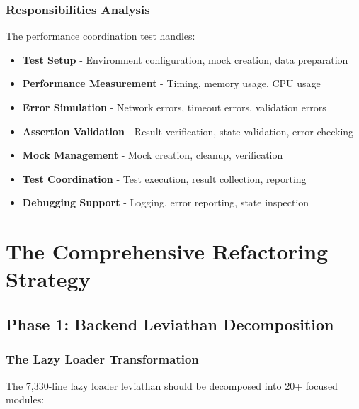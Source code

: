 \documentclass[11pt]{article}
\begin{document}
\subsubsection{Responsibilities Analysis}

The performance coordination test handles:

\begin{itemize}
\item \textbf{Test Setup} - Environment configuration, mock creation, data preparation
\item \textbf{Performance Measurement} - Timing, memory usage, CPU usage
\item \textbf{Error Simulation} - Network errors, timeout errors, validation errors
\item \textbf{Assertion Validation} - Result verification, state validation, error checking
\item \textbf{Mock Management} - Mock creation, cleanup, verification
\item \textbf{Test Coordination} - Test execution, result collection, reporting
\item \textbf{Debugging Support} - Logging, error reporting, state inspection
\end{itemize}

\section{The Comprehensive Refactoring Strategy}

\subsection{Phase 1: Backend Leviathan Decomposition}

\subsubsection{The Lazy Loader Transformation}

The 7,330-line lazy loader leviathan should be decomposed into 20+ focused modules:
\end{document}
